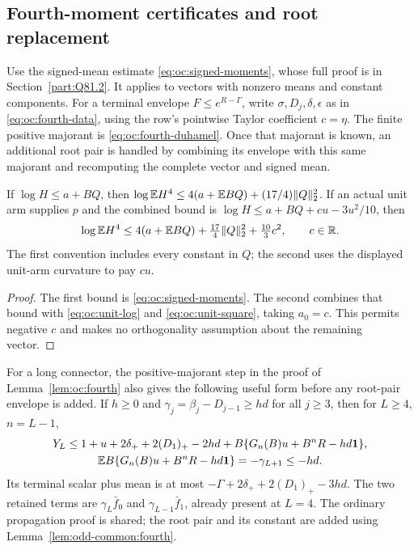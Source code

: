 \subsection{Fourth-moment certificates and root replacement}
\label{sec:odd-common:fourth}

Use the signed-mean estimate \eqref{eq:oc:signed-moments}, whose full
proof is in Section~\ref{part:Q81.2}. It applies to vectors with
nonzero means and constant components.
For a terminal envelope \(F\le e^{R-\Gamma}\), write
\(\sigma,D_j,\delta,\epsilon\) as in \eqref{eq:oc:fourth-data},
using the row's pointwise Taylor coefficient \(c=\eta\).
The finite positive majorant is \eqref{eq:oc:fourth-duhamel}.
Once that majorant is known, an additional root pair is handled by
combining its envelope with this same majorant and recomputing the
complete vector and signed mean.

\begin{lemma}
\label{lem:odd-common:fourth}\label{calc:five-root-curvature}
If \(\log H\le a+BQ\), then
\(\log\mathbb E H^4\le4(a+\mathbb E BQ)+(17/4)\|Q\|_2^2\).
If an actual unit arm supplies \(p\) and the combined bound is
\(\log H\le a+BQ+cu-3u^2/10\), then
\begin{equation}\label{eq:odd-common:curvature}
 \log\mathbb E H^4\le4(a+\mathbb E BQ)+\tfrac{17}{4}\|Q\|_2^2
                                  +\tfrac{10}{3}c^2,
 \qquad c\in\mathbb R.
\end{equation}
The first convention includes every constant in \(Q\); the second
uses the displayed unit-arm curvature to pay \(cu\).
\end{lemma}
\begin{proof}
The first bound is \eqref{eq:oc:signed-moments}. The second combines
that bound with \eqref{eq:oc:unit-log} and
\eqref{eq:oc:unit-square}, taking \(a_0=c\).
This permits negative \(c\) and makes no orthogonality assumption
about the remaining vector.
\end{proof}

For a long connector, the positive-majorant step in the proof of
Lemma~\ref{lem:oc:fourth} also gives the following useful form before
any root-pair envelope is added. If
\(h\ge0\) and \(\gamma_j=\beta_j-D_{j-1}\ge hd\) for all \(j\ge3\), then for
\(L\ge4\), \(n=L-1\),
\begin{equation}\label{eq:odd-common:long-parameters}
\begin{gathered}
 Y_L\le1+u+2\delta_++2(D_1)_+-2hd
       +B\{G_n(B)u+B^nR-hd\mathbf1\},\\
 \mathbb E B\{G_n(B)u+B^nR-hd\mathbf1\}
       =-\gamma_{L+1}\le-hd.
\end{gathered}
\end{equation}
Its terminal scalar plus mean is at most
\(-\Gamma+2\delta_++2(D_1)_+-3hd\).
The two retained terms are \(\gamma_L\bar f_0\) and
\(\gamma_{L-1}\bar f_1\), already present at \(L=4\).
The ordinary propagation proof is shared; the root pair and its
constant are added using Lemma~\ref{lem:odd-common:fourth}.

